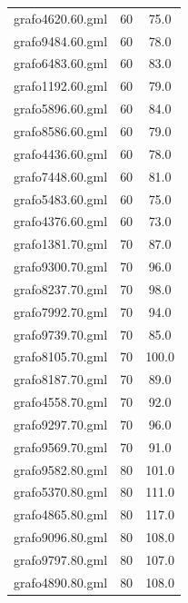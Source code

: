 \documentclass[bachelor, english]{algothesis}
\begin{document}
\begin{minipage}{0.5\textwidth}

\begin{xtabular}{|c|c|c|}
grafo4620.60.gml & 60 & 75.0 \\
grafo9484.60.gml & 60 & 78.0 \\
grafo6483.60.gml & 60 & 83.0 \\
grafo1192.60.gml & 60 & 79.0 \\
grafo5896.60.gml & 60 & 84.0 \\
grafo8586.60.gml & 60 & 79.0 \\
grafo4436.60.gml & 60 & 78.0 \\
grafo7448.60.gml & 60 & 81.0 \\
grafo5483.60.gml & 60 & 75.0 \\
grafo4376.60.gml & 60 & 73.0 \\
\hline
grafo1381.70.gml & 70 & 87.0 \\
grafo9300.70.gml & 70 & 96.0 \\
grafo8237.70.gml & 70 & 98.0 \\
grafo7992.70.gml & 70 & 94.0 \\
grafo9739.70.gml & 70 & 85.0 \\
grafo8105.70.gml & 70 & 100.0 \\
grafo8187.70.gml & 70 & 89.0 \\
grafo4558.70.gml & 70 & 92.0 \\
grafo9297.70.gml & 70 & 96.0 \\
grafo9569.70.gml & 70 & 91.0 \\
\hline
grafo9582.80.gml & 80 & 101.0 \\
grafo5370.80.gml & 80 & 111.0 \\
grafo4865.80.gml & 80 & 117.0 \\
grafo9096.80.gml & 80 & 108.0 \\
grafo9797.80.gml & 80 & 107.0 \\
grafo4890.80.gml & 80 & 108.0 \\
\end{xtabular}
\end{minipage}

\clearpage
\end{document}
